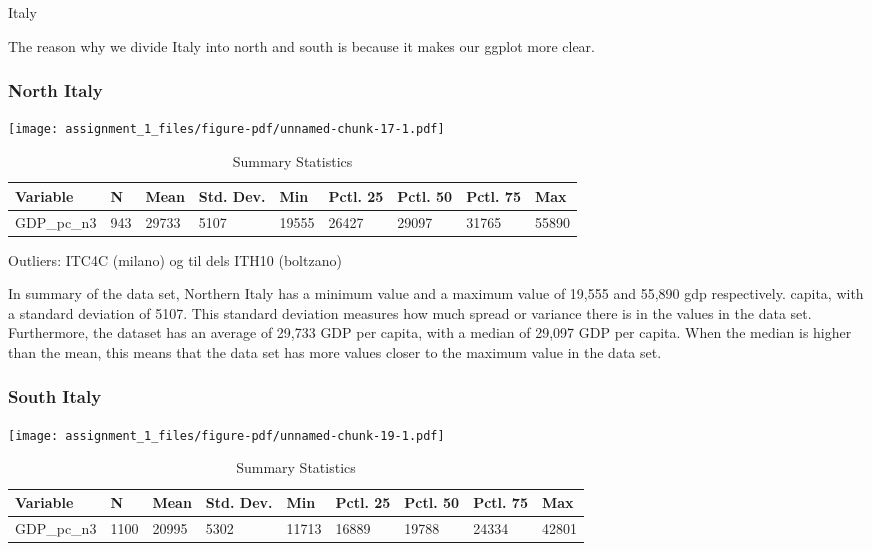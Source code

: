 \documentclass[
  letterpaper,
  DIV=11,
  numbers=noendperiod]{scrartcl}
\begin{document}
Italy

The reason why we divide Italy into north and south is because it makes
our ggplot more clear.

\hypertarget{north-italy}{%
\subsubsection{North Italy}\label{north-italy}}

\texttt{[image: assignment\_1\_files/figure-pdf/unnamed-chunk-17-1.pdf]}

\begin{table}

\caption{Summary Statistics}
\centering
\begin{tabular}[t]{lllllllll}
\toprule
Variable & N & Mean & Std. Dev. & Min & Pctl. 25 & Pctl. 50 & Pctl. 75 & Max\\
\midrule
GDP_pc_n3 & 943 & 29733 & 5107 & 19555 & 26427 & 29097 & 31765 & 55890\\
\bottomrule
\end{tabular}
\end{table}

Outliers: ITC4C (milano) og til dels ITH10 (boltzano)

In summary of the data set, Northern Italy has a minimum value and a
maximum value of 19,555 and 55,890 gdp respectively. capita, with a
standard deviation of 5107. This standard deviation measures how much
spread or variance there is in the values in the data set. Furthermore,
the dataset has an average of 29,733 GDP per capita, with a median of
29,097 GDP per capita. When the median is higher than the mean, this
means that the data set has more values closer to the maximum value in
the data set.

\hypertarget{south-italy}{%
\subsubsection{South Italy}\label{south-italy}}

\texttt{[image: assignment\_1\_files/figure-pdf/unnamed-chunk-19-1.pdf]}

\begin{table}

\caption{Summary Statistics}
\centering
\begin{tabular}[t]{lllllllll}
\toprule
Variable & N & Mean & Std. Dev. & Min & Pctl. 25 & Pctl. 50 & Pctl. 75 & Max\\
\midrule
GDP_pc_n3 & 1100 & 20995 & 5302 & 11713 & 16889 & 19788 & 24334 & 42801\\
\bottomrule
\end{tabular}
\end{table}
\end{document}
